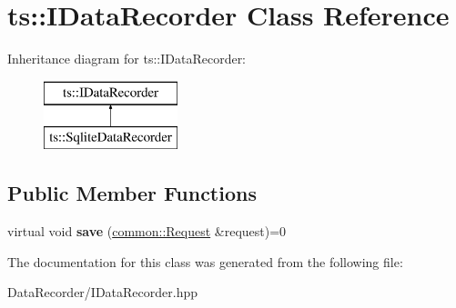 \hypertarget{classts_1_1_i_data_recorder}{}\section{ts\+:\+:I\+Data\+Recorder Class Reference}
\label{classts_1_1_i_data_recorder}
Inheritance diagram for ts\+:\+:I\+Data\+Recorder\+:\begin{figure}[H]
\begin{center}
\leavevmode
\includegraphics[height=2.000000cm]{classts_1_1_i_data_recorder}
\end{center}
\end{figure}
\subsection*{Public Member Functions}
\begin{DoxyCompactItemize}
\item 
\mbox{\label{classts_1_1_i_data_recorder_a2d58e3018ea0b14d64eef86cb6bfd3fb}} 
virtual void {\bfseries save} (\hyperlink{structts_1_1common_1_1_request}{common\+::\+Request} \&request)=0
\end{DoxyCompactItemize}


The documentation for this class was generated from the following file\+:\begin{DoxyCompactItemize}
\item 
Data\+Recorder/I\+Data\+Recorder.\+hpp\end{DoxyCompactItemize}
